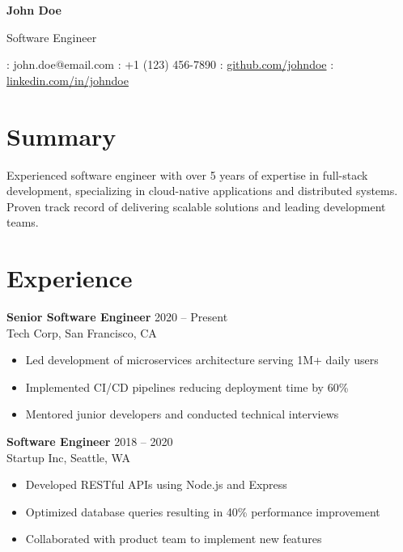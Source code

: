 \documentclass[11pt,a4paper]{article}
\newcommand{\contactItem}[2]{#1: #2\hspace{1cm}}
\begin{document}
\begin{center}
    {\Huge\textbf{John Doe}}

    \vspace{0.5em}
    {\large Software Engineer}

    \vspace{1em}
    \contactItem{\faEnvelope}{john.doe@email.com}
    \contactItem{\faPhone}{+1 (123) 456-7890}
    \contactItem{\faGithub}{\href{https://github.com/johndoe}{github.com/johndoe}}
    \contactItem{\faLinkedin}{\href{https://linkedin.com/in/johndoe}{linkedin.com/in/johndoe}}
\end{center}

\section{Summary}
Experienced software engineer with over 5 years of expertise in full-stack development,
specializing in cloud-native applications and distributed systems.
Proven track record of delivering scalable solutions and leading development teams.

\section{Experience}
\textbf{Senior Software Engineer} \hfill 2020 -- Present\\
Tech Corp, San Francisco, CA
\begin{itemize}[leftmargin=*]
    \item Led development of microservices architecture serving 1M+ daily users
    \item Implemented CI/CD pipelines reducing deployment time by 60\%
    \item Mentored junior developers and conducted technical interviews
\end{itemize}

\textbf{Software Engineer} \hfill 2018 -- 2020\\
Startup Inc, Seattle, WA
\begin{itemize}[leftmargin=*]
    \item Developed RESTful APIs using Node.js and Express
    \item Optimized database queries resulting in 40\% performance improvement
    \item Collaborated with product team to implement new features
\end{itemize}

\end{document}
